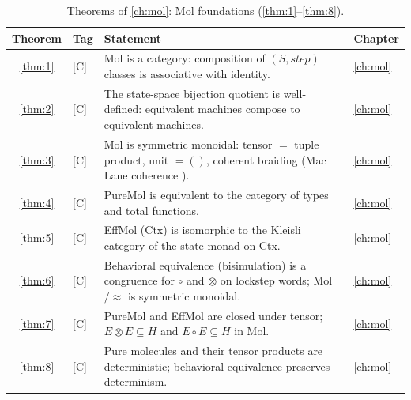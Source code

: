 \begin{table}[!htbp]
\centering
\caption{Theorems of \autoref{ch:mol}: Mol foundations (\autoref{thm:1}--\autoref{thm:8}).}
\label{tab:thm-mol}
\small
\begin{tabular}{@{}clp{7.2cm}l@{}}
\toprule
Theorem & Tag & Statement & Chapter\\
\midrule
\ref{thm:1} & [C] & Mol is a category: composition of $(S,\mathit{step})$ classes is associative with identity. & \autoref{ch:mol}\\
\ref{thm:2} & [C] & The state-space bijection quotient is well-defined: equivalent machines compose to equivalent machines. & \autoref{ch:mol}\\
\ref{thm:3} & [C] & Mol is symmetric monoidal: tensor $=$ tuple product, unit $=()$, coherent braiding (Mac Lane coherence \cite{maclane}). & \autoref{ch:mol}\\
\ref{thm:4} & [C] & PureMol is equivalent to the category of types and total functions. & \autoref{ch:mol}\\
\ref{thm:5} & [C] & EffMol (Ctx) is isomorphic to the Kleisli category of the state monad on Ctx. & \autoref{ch:mol}\\
\ref{thm:6} & [C] & Behavioral equivalence (bisimulation) is a congruence for $\circ$ and $\otimes$ on lockstep words; Mol$/\!\!\approx$ is symmetric monoidal. & \autoref{ch:mol}\\
\ref{thm:7} & [C] & PureMol and EffMol are closed under tensor; $E \otimes E \subseteq H$ and $E \circ E \subseteq H$ in Mol. & \autoref{ch:mol}\\
\ref{thm:8} & [C] & Pure molecules and their tensor products are deterministic; behavioral equivalence preserves determinism. & \autoref{ch:mol}\\
\bottomrule
\end{tabular}
\end{table}

